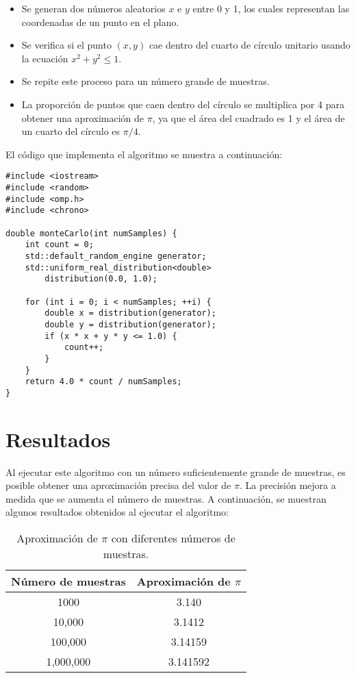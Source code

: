 \documentclass[a4paper, 10pt]{IEEEtran}
\begin{document}
\begin{itemize}
    \item Se generan dos números aleatorios $x$ e $y$ entre 0 y 1, los cuales representan las coordenadas de un punto en el plano.
    \item Se verifica si el punto $(x, y)$ cae dentro del cuarto de círculo unitario usando la ecuación $x^2 + y^2 \leq 1$.
    \item Se repite este proceso para un número grande de muestras.
    \item La proporción de puntos que caen dentro del círculo se multiplica por 4 para obtener una aproximación de $\pi$, ya que el área del cuadrado es 1 y el área de un cuarto del círculo es $\pi/4$.
\end{itemize}

El código que implementa el algoritmo se muestra a continuación:

\begin{verbatim}
#include <iostream>
#include <random>
#include <omp.h>
#include <chrono>

double monteCarlo(int numSamples) {
    int count = 0;
    std::default_random_engine generator;
    std::uniform_real_distribution<double> 
        distribution(0.0, 1.0);

    for (int i = 0; i < numSamples; ++i) {
        double x = distribution(generator);
        double y = distribution(generator);
        if (x * x + y * y <= 1.0) {
            count++;
        }
    }
    return 4.0 * count / numSamples;
}
\end{verbatim}

\section{Resultados}
Al ejecutar este algoritmo con un número suficientemente grande de muestras, es posible obtener una aproximación precisa del valor de $\pi$. La precisión mejora a medida que se aumenta el número de muestras. A continuación, se muestran algunos resultados obtenidos al ejecutar el algoritmo:

\begin{table}[H]
    \centering
    \begin{tabular}{|c|c|}
    \hline
    \textbf{Número de muestras} & \textbf{Aproximación de $\pi$} \\
    \hline
    1000 & 3.140 \\
    10,000 & 3.1412 \\
    100,000 & 3.14159 \\
    1,000,000 & 3.141592 \\
    \hline
    \end{tabular}
    \caption{Aproximación de $\pi$ con diferentes números de muestras.}
    \label{tab:results}
\end{table}
\end{document}
